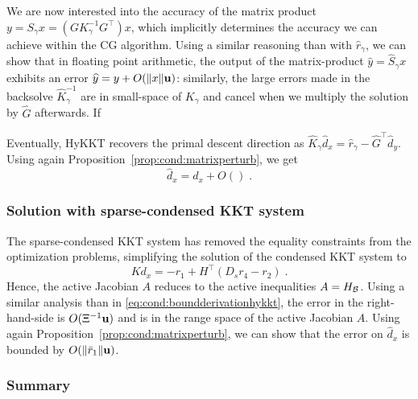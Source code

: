 We are now interested into the accuracy of the matrix product
$y = S_\gamma x = (G K_{\gamma}^{-1} G^\top) x$, which implicitly determines
the accuracy we can achieve within the CG algorithm. Using a similar reasoning than with $\widehat{r}_\gamma$, we can
show that in floating point arithmetic, the output of the matrix-product
$\widehat{y} = \widehat{S}_\gamma x$ exhibits an error $\widehat{y} = y + O(\|x\| \mathbf{u})$:
similarly, the large errors made in the backsolve $\widehat{K}_\gamma^{-1}$
are in small-space of $K_\gamma$ and cancel
when we multiply the solution by $\widehat{G}$ afterwards.
If

Eventually, HyKKT recovers the primal descent direction as $\widehat{K}_\gamma \widehat{d}_x = \widehat{r}_\gamma - \widehat{G}^\top \widehat{d}_y$. Using again Proposition~\ref{prop:cond:matrixperturb}, we get
\begin{equation}
  \widehat{d}_x = d_x + O() \; .
\end{equation}


\subsubsection{Solution with sparse-condensed KKT system}
The sparse-condensed KKT system has removed the equality
constraints from the optimization problems, simplifying
the solution of the condensed KKT system to
\begin{equation}
  K d_x = -r_1 + H^\top (D_s r_4 - r_2) \; .
\end{equation}
Hence, the active Jacobian $A$ reduces to the active inequalities $A = H_{\mathcal{B}}$.
Using a similar analysis than in \eqref{eq:cond:boundderivationhykkt},
the error in the right-hand-side is $O(\Xi^{-1} \mathbf{u})$ and is in the
range space of the active Jacobian $A$. Using again Proposition~\ref{prop:cond:matrixperturb},
we can show that the error on $\widehat{d}_x$ is bounded by $O(\|\bar{r}_1\| \mathbf{u})$.

\subsubsection{Summary}


